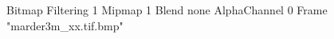 {Bitmap
	{Filtering 1}
	{Mipmap 1}
	{Blend none}
	{AlphaChannel 0}
	{Frame "marder3m_xx.tif.bmp"}
}
